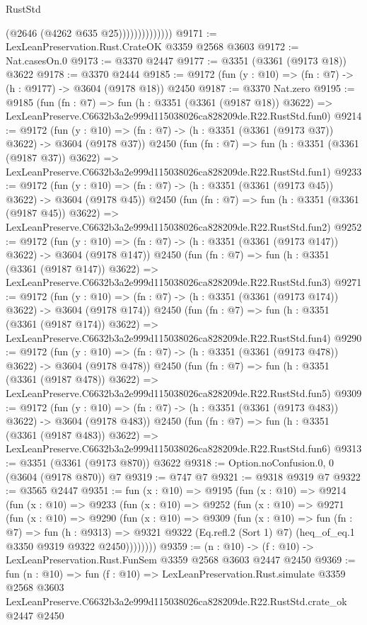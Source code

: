 \begin{lexlean}{RustStd}
\begin{coremodule}
                            (@2646 (@4262 @635 @25))))))))))))))
@9171 := LexLeanPreservation.Rust.CrateOK @3359 @2568 @3603
@9172 := Nat.casesOn.{0}
@9173 := @3370 @2447
@9177 := @3351 (@3361 (@9173 @18)) @3622
@9178 := @3370 @2444
@9185 := @9172 (fun (y : @10) => (fn : @7) -> (h : @9177) -> @3604 (@9178 @18)) @2450
@9187 := @3370 Nat.zero
@9195 := @9185
    (fun (fn : @7) =>
    fun (h : @3351 (@3361 (@9187 @18)) @3622) =>
    LexLeanPreserve.C6632b3a2e999d115038026ca828209de.R22.RustStd.fun0)
@9214 := @9172
    (fun (y : @10) => (fn : @7) -> (h : @3351 (@3361 (@9173 @37)) @3622) -> @3604 (@9178 @37))
    @2450
    (fun (fn : @7) =>
    fun (h : @3351 (@3361 (@9187 @37)) @3622) =>
    LexLeanPreserve.C6632b3a2e999d115038026ca828209de.R22.RustStd.fun1)
@9233 := @9172
    (fun (y : @10) => (fn : @7) -> (h : @3351 (@3361 (@9173 @45)) @3622) -> @3604 (@9178 @45))
    @2450
    (fun (fn : @7) =>
    fun (h : @3351 (@3361 (@9187 @45)) @3622) =>
    LexLeanPreserve.C6632b3a2e999d115038026ca828209de.R22.RustStd.fun2)
@9252 := @9172
    (fun (y : @10) => (fn : @7) -> (h : @3351 (@3361 (@9173 @147)) @3622) -> @3604 (@9178 @147))
    @2450
    (fun (fn : @7) =>
    fun (h : @3351 (@3361 (@9187 @147)) @3622) =>
    LexLeanPreserve.C6632b3a2e999d115038026ca828209de.R22.RustStd.fun3)
@9271 := @9172
    (fun (y : @10) => (fn : @7) -> (h : @3351 (@3361 (@9173 @174)) @3622) -> @3604 (@9178 @174))
    @2450
    (fun (fn : @7) =>
    fun (h : @3351 (@3361 (@9187 @174)) @3622) =>
    LexLeanPreserve.C6632b3a2e999d115038026ca828209de.R22.RustStd.fun4)
@9290 := @9172
    (fun (y : @10) => (fn : @7) -> (h : @3351 (@3361 (@9173 @478)) @3622) -> @3604 (@9178 @478))
    @2450
    (fun (fn : @7) =>
    fun (h : @3351 (@3361 (@9187 @478)) @3622) =>
    LexLeanPreserve.C6632b3a2e999d115038026ca828209de.R22.RustStd.fun5)
@9309 := @9172
    (fun (y : @10) => (fn : @7) -> (h : @3351 (@3361 (@9173 @483)) @3622) -> @3604 (@9178 @483))
    @2450
    (fun (fn : @7) =>
    fun (h : @3351 (@3361 (@9187 @483)) @3622) =>
    LexLeanPreserve.C6632b3a2e999d115038026ca828209de.R22.RustStd.fun6)
@9313 := @3351 (@3361 (@9173 @870)) @3622
@9318 := Option.noConfusion.{0, 0} (@3604 (@9178 @870)) @7
@9319 := @747 @7
@9321 := @9318 @9319 @7
@9322 := @3565 @2447
@9351 := fun (x : @10) =>
  @9195
    (fun (x : @10) =>
    @9214
      (fun (x : @10) =>
      @9233
        (fun (x : @10) =>
        @9252
          (fun (x : @10) =>
          @9271
            (fun (x : @10) =>
            @9290
              (fun (x : @10) =>
              @9309
                (fun (x : @10) =>
                fun (fn : @7) =>
                fun (h : @9313) =>
                @9321 @9322 (Eq.refl.{2} (Sort 1) @7) (heq_of_eq.{1} @3350 @9319 @9322 @2450))))))))
@9359 := (n : @10) -> (f : @10) -> LexLeanPreservation.Rust.FunSem @3359 @2568 @3603 @2447 @2450
@9369 := fun (n : @10) =>
  fun (f : @10) =>
  LexLeanPreservation.Rust.simulate
    @3359
    @2568
    @3603
    LexLeanPreserve.C6632b3a2e999d115038026ca828209de.R22.RustStd.crate_ok
    @2447
    @2450
\end{coremodule}
\end{lexlean}

